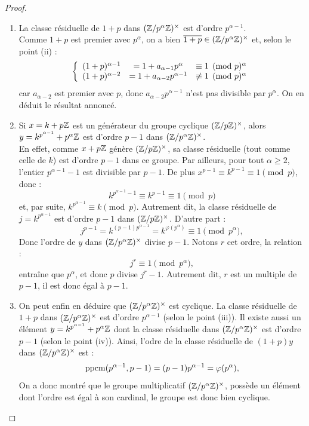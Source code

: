 \begin{proof}
\begin{enumerate}[label=(\roman*)]
\item
La classe résiduelle de $1+p$ dans $(\mathbb{Z}/p^{\alpha}\mathbb{Z})^{\times}$ est d'ordre $p^{\alpha-1}$. \\
Comme $1+p$ est premier avec $p^{\alpha}$, on a bien $\overline{1+p} \in (\mathbb{Z}/p^{\alpha}\mathbb{Z})^{\times}$ et, selon le point (ii) :
\[ \left \{ \begin{array}{c c c}
(1+p)^{\alpha-1} & = 1 + a_{\alpha-1}p^{\alpha} & \equiv 1 \pmod p^{\alpha} \\
(1+p)^{\alpha-2} & = 1 + a_{\alpha-2}p^{\alpha-1} & \not \equiv 1 \pmod p^{\alpha}
\end{array} \right. \]
car $a_{\alpha-2}$ est premier avec $p$, donc $a_{\alpha-2}p^{\alpha-1}$ n'est pas divisible par $p^{\alpha}$.
On en déduit le résultat annoncé.

\item
Si $x = k+ p\mathbb{Z}$ est un générateur du groupe cyclique $(\mathbb{Z}/p\mathbb{Z})^{\times}$, alors $y=k^{p^{\alpha-1}}+p^{\alpha}\mathbb{Z}$ est d'ordre $p-1$ dans
$(\mathbb{Z}/p^{\alpha}\mathbb{Z})^{\times}$. \\
En effet, comme $x + p\mathbb{Z}$ génère $(\mathbb{Z}/p\mathbb{Z})^{\times}$, sa classe résiduelle (tout comme celle de $k$) est d'ordre $p-1$ dans ce groupe. 
Par ailleurs, pour tout $\alpha \geq 2$, l'entier $p^{\alpha-1} - 1$ est divisible par $p-1$.
De plus $x^{p-1} \equiv k^{p-1} \equiv 1 \pmod p$, donc :
\[ k^{p^{\alpha-1}-1} \equiv k^{p-1} \equiv 1 \pmod p \]
et, par suite, $k^{p^{\alpha-1}} \equiv k \pmod p$. 
Autrement dit, la classe résiduelle de $j=k^{p^{\alpha-1}}$ est d'ordre $p-1$ dans $(\mathbb{Z}/p\mathbb{Z})^{\times}$.
D'autre part :
\[ j^{p-1} = k^{(p-1)p^{\alpha-1}} = k ^{\varphi(p^{\alpha})} \equiv 1 \pmod p^{\alpha} , \]
Donc l'ordre de $y$ dans $(\mathbb{Z}/p^{\alpha}\mathbb{Z})^{\times}$ divise $p-1$. Notons $r$ cet ordre, la relation :
\[ j^r \equiv 1 \pmod p^{\alpha} , \]
entraîne que $p^{\alpha}$, et donc $p$ divise $j^r-1$.
Autrement dit, $r$ est un multiple de $p-1$, il est donc égal à $p-1$.

\item
On peut enfin en déduire que $(\mathbb{Z}/p^{\alpha}\mathbb{Z})^{\times}$ est cyclique. 
La classe résiduelle de $1+p$ dans $(\mathbb{Z}/p^{\alpha}\mathbb{Z})^{\times}$ est d'ordre $p^{\alpha-1}$ (selon le point (iii)).
Il existe aussi un élément $y=k^{p^{\alpha-1}}+p^{\alpha}\mathbb{Z}$ dont la classe résiduelle 
dans $(\mathbb{Z}/p^{\alpha}\mathbb{Z})^{\times}$ est d'ordre $p-1$ (selon le point (iv)).
Ainsi, l'odre de la classe résiduelle de $(1+p)y$ dans $(\mathbb{Z}/p^{\alpha}\mathbb{Z})^{\times}$ est :
\[ \operatorname{ppcm}(p^{\alpha-1}, p-1) = (p-1) p^{\alpha-1} = \varphi(p^{\alpha}) , \]
On a donc montré que le groupe multiplicatif $(\mathbb{Z}/p^{\alpha}\mathbb{Z})^{\times}$, possède un élément dont l'ordre est égal à son cardinal, 
le groupe est donc bien cyclique.
\end{enumerate}
\end{proof}




